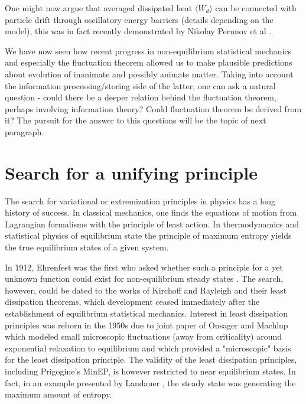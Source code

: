 \documentclass[a4paper,12pt]{article}
\begin{document}
One might now argue that averaged dissipated heat $\langle W_d \rangle $ can be connected with particle drift through oscillatory energy barriers (details depending on the model), this was in fact recently demonstrated by Nikolay Perunov et al \cite{Perunov:2016hl}.

We have now seen how recent progress in non-equilibrium statistical mechanics and especially the fluctuation theorem allowed us to make plausible predictions about evolution of inanimate and possibly animate matter.
Taking into account the information processing/storing side of the latter, one can ask a natural question - could there be a deeper relation behind the fluctuation theorem, perhaps involving information theory? Could fluctuation theorem be derived from it?
The pursuit for the answer to this questions will be the topic of next paragraph.

\section{Search for a unifying principle}
\label{UnifyingPrinciple}
The search for variational or extremization principles in physics has a long history of success. In classical mechanics, one finds the equations of motion from Lagrangian formalisms with the principle of least action. In thermodynamics and statistical physics of equilibrium state the principle of maximum entropy yields the true equilibrium states of a given system. 

In 1912, Ehrenfest was the first who asked whether such a principle for a yet unknown function could exist for non-equilibrium steady states \cite{Dewar:2014ek}.
The search, however, could be dated to the works of Kirchoff and Rayleigh and their least dissipation theorems, which development ceased immediately after the establishment of equilibrium statistical mechanics.
Interest in least dissipation principles was reborn in the 1950s due to joint paper of Onsager and Machlup \cite{Onsager:3UFhYpWV} which modeled small microscopic fluctuations (away from criticality) around exponential relaxation to equilibrium and which provided a "microscopic" basis for the least dissipation principle. The validity of the least dissipation principles, including Prigogine's MinEP, is however restricted to near equilibrium states. In fact, in an example presented by Landauer \cite{Landauer:pJ4RYJRG}, the steady state was generating the maximum amount of entropy.
\end{document}
